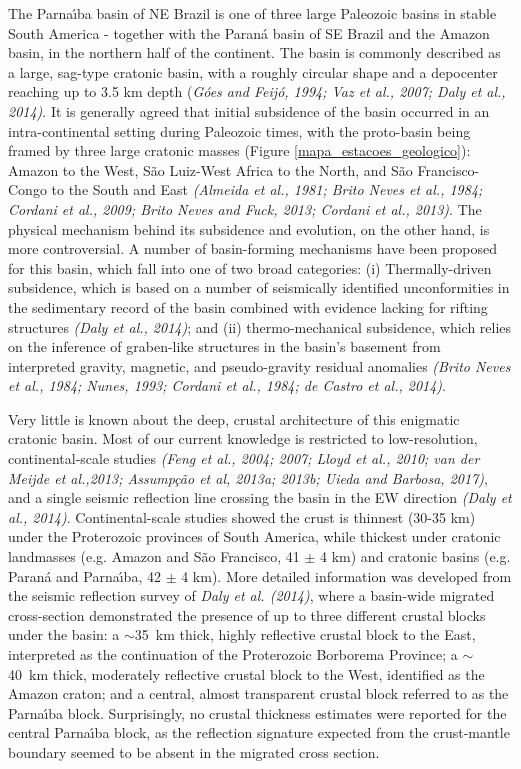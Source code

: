 \documentclass[manuscript,11pt]{geophysics}
\begin{document}
The Parna\'{\i}ba basin of NE Brazil is one of three large Paleozoic basins in stable South America - together with the Paran\'a basin of SE Brazil and the Amazon basin, in the northern half of the continent. The basin is commonly described as a large, sag-type cratonic basin, with a roughly circular shape and a depocenter reaching up to 3.5 km depth (\textit{G\'oes and Feij\'o, 1994; Vaz et al., 2007; Daly et al., 2014)}. It is generally agreed that initial subsidence of the basin occurred in an intra-continental setting during Paleozoic times, with the proto-basin being framed by three large cratonic masses (Figure \ref{mapa_estacoes_geologico}): Amazon to the West, S\~ao Luiz-West Africa to the North, and S\~ao Francisco-Congo to the South and East \textit{(Almeida et al., 1981; Brito Neves et al., 1984; Cordani et al., 2009; Brito Neves and Fuck, 2013; Cordani et al., 2013)}. The physical mechanism behind its subsidence and evolution, on the other hand, is more controversial. A number of basin-forming mechanisms have been proposed for this basin, which fall into one of two broad categories: (i) Thermally-driven subsidence, which is based on a number of seismically identified unconformities in the sedimentary record of the basin combined with evidence lacking for rifting structures \textit{(Daly et al., 2014)}; and (ii) thermo-mechanical subsidence, which relies on the inference of graben-like structures in the basin's basement from interpreted gravity, magnetic, and pseudo-gravity residual anomalies \textit{(Brito Neves et al., 1984; Nunes, 1993; Cordani et al., 1984; de Castro et al., 2014)}. 

Very little is known about the deep, crustal architecture of this enigmatic cratonic basin. Most of our current knowledge is restricted to low-resolution, continental-scale studies \textit{(Feng et al., 2004; 2007; Lloyd et al., 2010; van der Meijde et al.,2013; Assump\c{c}\~ao et al, 2013a; 2013b; Uieda and Barbosa, 2017)}, and a single seismic reflection line crossing the basin in the EW direction \textit{(Daly et al., 2014)}. Continental-scale studies showed the crust is thinnest (30-35 km) under the Proterozoic provinces of South America, while thickest under cratonic landmasses (e.g. Amazon and São Francisco, 41 $\pm$ 4 km) and cratonic basins (e.g. Paran\'a and Parna\'{\i}ba, 42 $\pm$ 4 km). More detailed information was developed from the seismic reflection survey of \textit{Daly et al. (2014)}, where a basin-wide migrated cross-section demonstrated the presence of up to three different crustal blocks under the basin: a $\sim$35~km thick, highly reflective crustal block to the East, interpreted as the continuation of the Proterozoic Borborema Province; a $\sim$40~km thick, moderately reflective crustal block to the West, identified as the Amazon craton; and a central, almost transparent crustal block referred to as the Parna\'{\i}ba block. Surprisingly, no crustal thickness estimates were reported for the central Parna\'{\i}ba block, as the reflection signature expected from the crust-mantle boundary seemed to be absent in the migrated cross section. 
\end{document}
